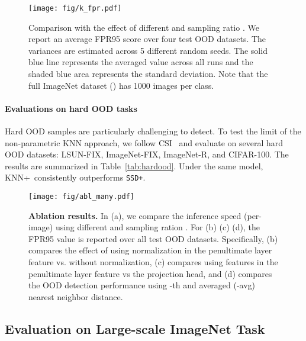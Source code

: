 \documentclass[nohyperref]{article}
\newcommand{\methodplus}{{KNN+}}
\theoremstyle{plain}
\theoremstyle{definition}
\theoremstyle{remark}
\begin{document}
\begin{figure*}[tb]
\begin{center}
		\texttt{[image: fig/k\_fpr.pdf]}
	\end{center}
	\vspace{-0.4cm}
	\caption{Comparison with the effect of different  and sampling ratio . We report an average FPR95 score over four test OOD datasets. The variances are estimated across 5 different random seeds. The solid blue line represents the averaged value across all runs and the shaded blue area represents the standard deviation. Note that the full ImageNet dataset () has 1000 images per class. }
	\label{fig:k_fpr}
\end{figure*}





\paragraph{Evaluations on hard OOD tasks} Hard OOD samples are particularly
challenging to detect. To test the limit of the  non-parametric KNN approach, we follow CSI~\citep{tack2020csi} and evaluate on several hard OOD datasets: LSUN-FIX, ImageNet-FIX, ImageNet-R, and CIFAR-100. The results are summarized in Table~\ref{tab:hardood}. Under the same model, {\methodplus~consistently outperforms \texttt{SSD+}}. 







\begin{figure*}[t]
\begin{center}
		\texttt{[image: fig/abl\_many.pdf]}
	\end{center}
\caption{\small  \textbf{Ablation results.} In (a), we compare the inference speed (per-image) using different  and sampling ration . For (b) (c) (d), the FPR95 value is reported over all test OOD datasets. Specifically, (b) compares the effect of using normalization in the penultimate layer feature vs. without normalization, (c) compares using features in the penultimate layer feature vs the projection head, and (d) compares the OOD detection performance using  -th and averaged  (-avg) nearest neighbor distance. }
	\label{fig:abl_many}
\end{figure*} 





\subsection{Evaluation on Large-scale ImageNet Task}
\label{sec:imagenet}
\end{document}
